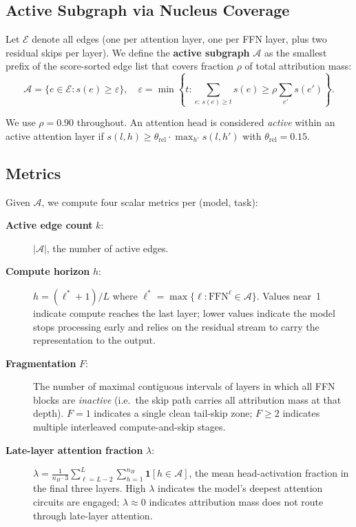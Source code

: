 \documentclass{article}
\begin{document}
\subsection{Active Subgraph via Nucleus Coverage}

Let $\mathcal{E}$ denote all edges (one per attention layer, one per FFN
layer, plus two residual skips per layer).
We define the \textbf{active subgraph} $\mathcal{A}$ as the smallest
prefix of the score-sorted edge list that covers fraction $\rho$ of
total attribution mass:
\begin{equation}
  \mathcal{A} = \bigl\{ e \in \mathcal{E} : s(e) \geq \varepsilon \bigr\},
  \quad
  \varepsilon = \min\!\left\{ t : \sum_{e:\,s(e)\geq t} s(e)
    \geq \rho \sum_{e'} s(e') \right\}.
\end{equation}

We use $\rho = 0.90$ throughout.
An attention head is considered \emph{active} within an active attention
layer if $s(l,h) \geq \theta_{\mathrm{rel}} \cdot \max_{h'} s(l,h')$
with $\theta_{\mathrm{rel}}=0.15$.

\subsection{Metrics}

Given $\mathcal{A}$, we compute four scalar metrics per (model, task):

\begin{description}
  \item[\textbf{Active edge count} $k$:]
    $|\mathcal{A}|$, the number of active edges.

  \item[\textbf{Compute horizon} $h$:]
    $h = (\ell^*+1)/L$ where $\ell^* = \max\{\ell : \mathrm{FFN}^\ell
    \in \mathcal{A}\}$.
    Values near~1 indicate compute reaches the last layer;
    lower values indicate the model stops processing early and relies on
    the residual stream to carry the representation to the output.

  \item[\textbf{Fragmentation} $F$:]
    The number of maximal contiguous intervals of layers in which all
    FFN blocks are \emph{inactive} (i.e.\ the skip path carries all
    attribution mass at that depth).
    $F=1$ indicates a single clean tail-skip zone; $F\geq2$ indicates
    multiple interleaved compute-and-skip stages.

  \item[\textbf{Late-layer attention fraction} $\lambda$:]
    $\lambda = \frac{1}{n_H \cdot 3} \sum_{\ell=L-2}^{L}
    \sum_{h=1}^{n_H} \mathbf{1}[h \in \mathcal{A}]$,
    the mean head-activation fraction in the final three layers.
    High $\lambda$ indicates the model's deepest attention circuits
    are engaged; $\lambda \approx 0$ indicates attribution mass does
    not route through late-layer attention.
\end{description}
\end{document}
